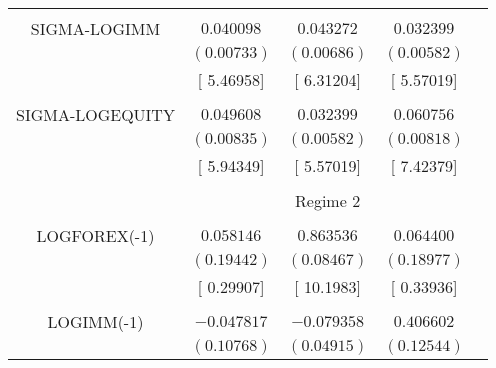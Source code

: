 \begin{tabular}{lrrrr}
\multicolumn{1}{c}{}&\multicolumn{1}{c}{}&\multicolumn{1}{c}{}&\multicolumn{1}{c}{}&\multicolumn{1}{c}{}\\
\multicolumn{1}{c}{SIGMA-LOGIMM}&\multicolumn{1}{c}{$0.040098$}&\multicolumn{1}{c}{$0.043272$}&\multicolumn{1}{c}{$0.032399$}&\multicolumn{1}{c}{}\\
\multicolumn{1}{c}{}&\multicolumn{1}{c}{$(0.00733)$}&\multicolumn{1}{c}{$(0.00686)$}&\multicolumn{1}{c}{$(0.00582)$}&\multicolumn{1}{c}{}\\
\multicolumn{1}{c}{}&\multicolumn{1}{c}{[ 5.46958]}&\multicolumn{1}{c}{[ 6.31204]}&\multicolumn{1}{c}{[ 5.57019]}&\multicolumn{1}{c}{}\\
\multicolumn{1}{c}{}&\multicolumn{1}{c}{}&\multicolumn{1}{c}{}&\multicolumn{1}{c}{}&\multicolumn{1}{c}{}\\
\multicolumn{1}{c}{SIGMA-LOGEQUITY}&\multicolumn{1}{c}{$0.049608$}&\multicolumn{1}{c}{$0.032399$}&\multicolumn{1}{c}{$0.060756$}&\multicolumn{1}{c}{}\\
\multicolumn{1}{c}{}&\multicolumn{1}{c}{$(0.00835)$}&\multicolumn{1}{c}{$(0.00582)$}&\multicolumn{1}{c}{$(0.00818)$}&\multicolumn{1}{c}{}\\
\multicolumn{1}{c}{}&\multicolumn{1}{c}{[ 5.94349]}&\multicolumn{1}{c}{[ 5.57019]}&\multicolumn{1}{c}{[ 7.42379]}&\multicolumn{1}{c}{}\\
[4.5pt] \hline \\ [-4.5pt]
\multicolumn{1}{c}{}&\multicolumn{3}{c}{Regime 2}&\multicolumn{1}{c}{}\\
[4.5pt] \hline \\ [-4.5pt]
\multicolumn{1}{c}{LOGFOREX(-1)}&\multicolumn{1}{c}{$0.058146$}&\multicolumn{1}{c}{$0.863536$}&\multicolumn{1}{c}{$0.064400$}&\multicolumn{1}{c}{}\\
\multicolumn{1}{c}{}&\multicolumn{1}{c}{$(0.19442)$}&\multicolumn{1}{c}{$(0.08467)$}&\multicolumn{1}{c}{$(0.18977)$}&\multicolumn{1}{c}{}\\
\multicolumn{1}{c}{}&\multicolumn{1}{c}{[ 0.29907]}&\multicolumn{1}{c}{[ 10.1983]}&\multicolumn{1}{c}{[ 0.33936]}&\multicolumn{1}{c}{}\\
\multicolumn{1}{c}{}&\multicolumn{1}{c}{}&\multicolumn{1}{c}{}&\multicolumn{1}{c}{}&\multicolumn{1}{c}{}\\
\multicolumn{1}{c}{LOGIMM(-1)}&\multicolumn{1}{c}{$-0.047817$}&\multicolumn{1}{c}{$-0.079358$}&\multicolumn{1}{c}{$0.406602$}&\multicolumn{1}{c}{}\\
\multicolumn{1}{c}{}&\multicolumn{1}{c}{$(0.10768)$}&\multicolumn{1}{c}{$(0.04915)$}&\multicolumn{1}{c}{$(0.12544)$}&\multicolumn{1}{c}{}\\

\end{tabular}
